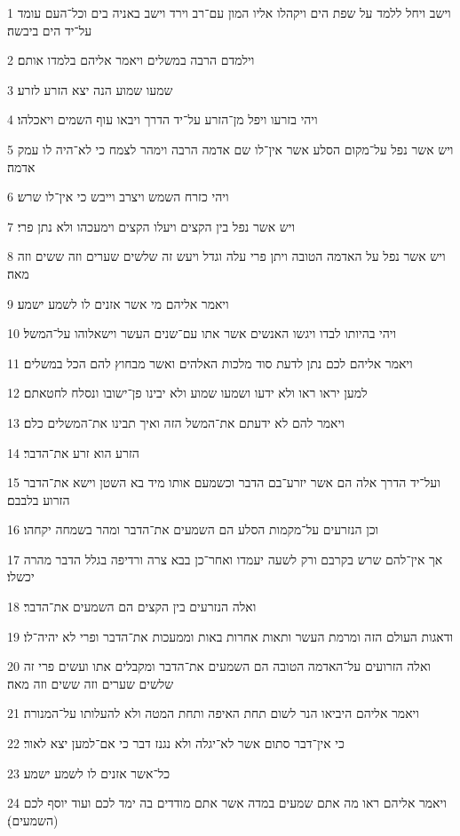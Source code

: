 \par 1 וישב ויחל ללמד על שפת הים ויקהלו אליו המון עם־רב וירד וישב באניה בים וכל־העם עומד על־יד הים ביבשה׃
\par 2 וילמדם הרבה במשלים ויאמר אליהם בלמדו אותם׃
\par 3 שמעו שמוע הנה יצא הזרע לזרע׃
\par 4 ויהי בזרעו ויפל מן־הזרע על־יד הדרך ויבאו עוף השמים ויאכלהו׃
\par 5 ויש אשר נפל על־מקום הסלע אשר אין־לו שם אדמה הרבה וימהר לצמח כי לא־היה לו עמק אדמה׃
\par 6 ויהי כזרח השמש ויצרב וייבש כי אין־לו שרש׃
\par 7 ויש אשר נפל בין הקצים ויעלו הקצים וימעכהו ולא נתן פרי׃
\par 8 ויש אשר נפל על האדמה הטובה ויתן פרי עלה וגדל ויעש זה שלשים שערים וזה ששים וזה מאה׃
\par 9 ויאמר אליהם מי אשר אזנים לו לשמע ישמע׃
\par 10 ויהי בהיותו לבדו ויגשו האנשים אשר אתו עם־שנים העשר וישאלוהו על־המשל׃
\par 11 ויאמר אליהם לכם נתן לדעת סוד מלכות האלהים ואשר מבחוץ להם הכל במשלים׃
\par 12 למען יראו ראו ולא ידעו ושמעו שמוע ולא יבינו פן־ישובו ונסלח לחטאתם׃
\par 13 ויאמר להם לא ידעתם את־המשל הזה ואיך תבינו את־המשלים כלם׃
\par 14 הזרע הוא זרע את־הדבר׃
\par 15 ועל־יד הדרך אלה הם אשר יזרע־בם הדבר וכשמעם אותו מיד בא השטן וישא את־הדבר הזרוע בלבבם׃
\par 16 וכן הנזרעים על־מקמות הסלע הם השמעים את־הדבר ומהר בשמחה יקחהו׃
\par 17 אך אין־להם שרש בקרבם ורק לשעה יעמדו ואחר־כן בבא צרה ורדיפה בגלל הדבר מהרה יכשלו׃
\par 18 ואלה הנזרעים בין הקצים הם השמעים את־הדבר׃
\par 19 ודאגות העולם הזה ומרמת העשר ותאות אחרות באות וממעכות את־הדבר ופרי לא יהיה־לו׃
\par 20 ואלה הזרועים על־האדמה הטובה הם השמעים את־הדבר ומקבלים אתו ועשים פרי זה שלשים שערים וזה ששים וזה מאה׃
\par 21 ויאמר אליהם היביאו הנר לשום תחת האיפה ותחת המטה ולא להעלותו על־המנורה׃
\par 22 כי אין־דבר סתום אשר לא־יגלה ולא נגנז דבר כי אם־למען יצא לאור׃
\par 23 כל־אשר אזנים לו לשמע ישמע׃
\par 24 ויאמר אליהם ראו מה אתם שמעים במדה אשר אתם מודדים בה ימד לכם ועוד יוסף לכם (השמעים)׃
